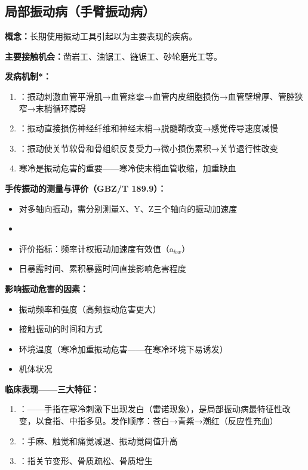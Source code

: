 \subsection{局部振动病（手臂振动病）}

\begin{keybox}
\textbf{概念：}长期使用振动工具引起以为主要表现的疾病。

\textbf{主要接触机会：}凿岩工、油锯工、链锯工、砂轮磨光工等。

\textbf{发病机制*：}
\begin{enumerate}[leftmargin=*]
    \item {}：振动刺激血管平滑肌→血管痉挛→血管内皮细胞损伤→血管壁增厚、管腔狭窄→末梢循环障碍
    \item {}：振动直接损伤神经纤维和神经末梢→脱髓鞘改变→感觉传导速度减慢
    \item {}：振动使关节软骨和骨组织反复受力→微小损伤累积→关节退行性改变
    \item 寒冷是振动危害的重要——寒冷使末梢血管收缩，加重缺血
\end{enumerate}

\textbf{手传振动的测量与评价（GBZ/T 189.9）：}
\begin{itemize}[leftmargin=*]
    \item 对多轴向振动，需分别测量X、Y、Z三个轴向的振动加速度
    \item {}
    \item 评价指标：频率计权振动加速度有效值（a$_{hw}$）
    \item 日暴露时间、累积暴露时间直接影响危害程度
\end{itemize}

\textbf{影响振动危害的因素：}
\begin{itemize}[leftmargin=*]
    \item 振动频率和强度（高频振动危害更大）
    \item 接触振动的时间和方式
    \item 环境温度（寒冷加重振动危害——在寒冷环境下易诱发）
    \item 机体状况
\end{itemize}

\textbf{临床表现——三大特征：}
\begin{enumerate}[leftmargin=*]
    \item {}：——手指在寒冷刺激下出现发白（雷诺现象），是局部振动病最特征性改变，以食指、中指多见。发作顺序：苍白→青紫→潮红（反应性充血）
    \item {}：手麻、触觉和痛觉减退、振动觉阈值升高
    \item {}：指关节变形、骨质疏松、骨质增生
\end{enumerate}


\end{keybox}
